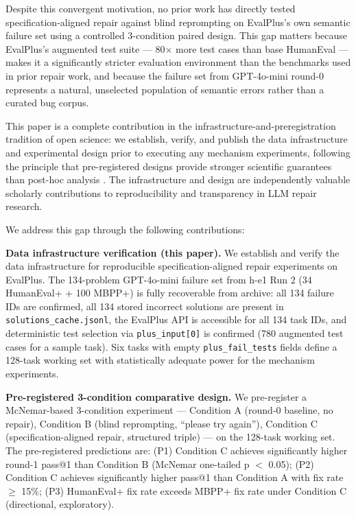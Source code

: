 Despite this convergent motivation, no prior work has directly tested specification-aligned
repair against blind reprompting on EvalPlus's own semantic failure set using a
controlled 3-condition paired design. This gap matters because EvalPlus's augmented
test suite --- 80$\times$ more test cases than base HumanEval --- makes it a significantly stricter
evaluation environment than the benchmarks used in prior repair work, and because the
failure set from GPT-4o-mini round-0 represents a natural, unselected population of
semantic errors rather than a curated bug corpus.

This paper is a complete contribution in the infrastructure-and-preregistration
tradition of open science: we establish, verify, and publish the data infrastructure
and experimental design prior to executing any mechanism experiments, following the
principle that pre-registered designs provide stronger scientific guarantees than
post-hoc analysis \citep{Nosek2018}. The infrastructure and design are
independently valuable scholarly contributions to reproducibility and transparency in
LLM repair research.

We address this gap through the following contributions:

\textbf{Data infrastructure verification (this paper).} We establish and verify the data
infrastructure for reproducible specification-aligned repair experiments on EvalPlus.
The 134-problem GPT-4o-mini failure set from h-e1 Run 2 (34 HumanEval+ + 100 MBPP+)
is fully recoverable from archive: all 134 failure IDs are confirmed, all 134 stored
incorrect solutions are present in \texttt{solutions\_cache.jsonl}, the EvalPlus API is
accessible for all 134 task IDs, and deterministic test selection via \texttt{plus\_input[0]}
is confirmed (780 augmented test cases for a sample task). Six tasks with empty
\texttt{plus\_fail\_tests} fields define a 128-task working set with statistically adequate
power for the mechanism experiments.

\textbf{Pre-registered 3-condition comparative design.} We pre-register a McNemar-based
3-condition experiment --- Condition A (round-0 baseline, no repair), Condition B
(blind reprompting, ``please try again''), Condition C (specification-aligned repair,
structured triple) --- on the 128-task working set. The pre-registered predictions are:
(P1) Condition C achieves significantly higher round-1 pass@1 than Condition B
(McNemar one-tailed p $<$ 0.05); (P2) Condition C achieves significantly higher pass@1
than Condition A with fix rate $\geq$ 15\%; (P3) HumanEval+ fix rate exceeds MBPP+ fix
rate under Condition C (directional, exploratory).

